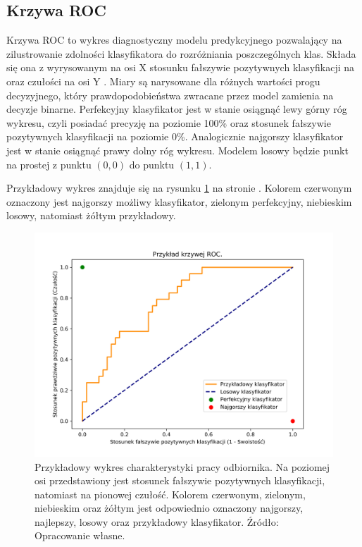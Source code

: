 \documentclass[inzynierska]{pwr_wmat_praca_dyplomowa}
\theoremstyle{plain}
\numberwithin{theorem}{chapter}
\theoremstyle{definition}
\numberwithin{theorem}{chapter}
\begin{document}
\subsection{Krzywa ROC}
\label{ROC}

Krzywa ROC to wykres diagnostyczny modelu predykcyjnego pozwalający na zilustrowanie zdolności klasyfikatora do rozróżniania poszczególnych klas. Składa się ona z wyrysowanym na osi X stosunku fałszywie pozytywnych klasyfikacji na oraz czułości na osi Y \cite{evaluation_metrics}. Miary są narysowane dla różnych wartości progu decyzyjnego, który prawdopodobieństwa zwracane przez model zamienia na decyzje binarne. Perfekcyjny klasyfikator jest w stanie osiągnąć lewy górny róg wykresu, czyli posiadać precyzję na poziomie 100\% oraz stosunek fałszywie pozytywnych klasyfikacji na poziomie 0\%. Analogicznie najgorszy klasyfikator jest w stanie osiągnąć prawy dolny róg wykresu. Modelem losowy będzie punkt na prostej z punktu $(0,0)$ do punktu $(1,1)$. 

Przykładowy wykres znajduje się na rysunku \ref{fig:roc_example} na stronie \pageref{fig:roc_example}. Kolorem czerwonym oznaczony jest najgorszy możliwy klasyfikator, zielonym perfekcyjny, niebieskim losowy, natomiast żółtym przykładowy.

\begin{figure}[h]
	\includegraphics[width=\linewidth]{images/roc_example.png}
	\caption{Przykładowy wykres charakterystyki pracy odbiornika. Na poziomej osi przedstawiony jest stosunek fałszywie pozytywnych klasyfikacji, natomiast na pionowej czułość. Kolorem czerwonym, zielonym, niebieskim oraz żółtym jest odpowiednio oznaczony najgorszy, najlepszy, losowy oraz przykładowy klasyfikator. Źródło: Opracowanie własne.}
	\label{fig:roc_example}
\end{figure}
\end{document}
